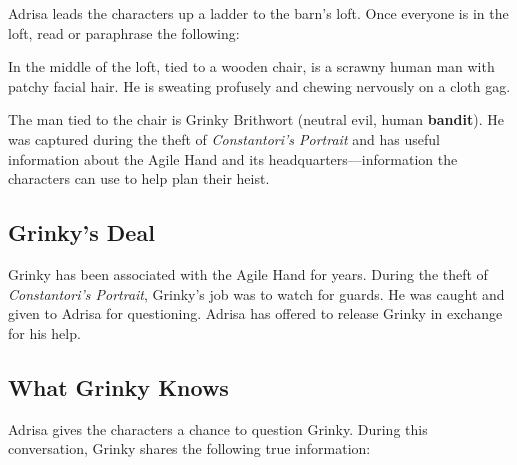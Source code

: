 \documentclass[10pt,a4paper,twoside,bg=print,twocolumn,openany,nodeprecatedcode]{dndbook}
\begin{document}
Adrisa leads the characters up a ladder to the barn's loft. Once everyone is in the loft, read or paraphrase the following:

\begin{DndReadAloud}{}
In the middle of the loft, tied to a wooden chair, is a scrawny human man with patchy facial hair. He is sweating profusely and chewing nervously on a cloth gag.

\end{DndReadAloud}

The man tied to the chair is Grinky Brithwort (neutral evil, human \textbf{bandit}). He was captured during the theft of \textit{Constantori's Portrait} and has useful information about the Agile Hand and its headquarters—information the characters can use to help plan their heist.

\subsection{Grinky's Deal}
Grinky has been associated with the Agile Hand for years. During the theft of \textit{Constantori's Portrait}, Grinky's job was to watch for guards. He was caught and given to Adrisa for questioning. Adrisa has offered to release Grinky in exchange for his help.

\subsection{What Grinky Knows}
Adrisa gives the characters a chance to question Grinky. During this conversation, Grinky shares the following true information:
\end{document}

